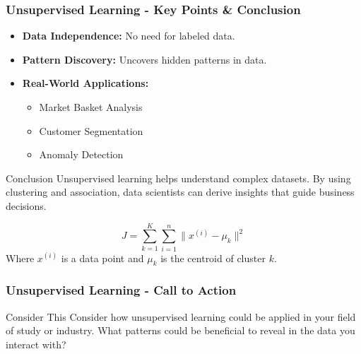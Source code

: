 \documentclass[aspectratio=169]{beamer}
\begin{document}
\begin{frame}[fragile]
    \frametitle{Unsupervised Learning - Key Points & Conclusion}
    \begin{itemize}
        \item \textbf{Data Independence:} No need for labeled data.
        \item \textbf{Pattern Discovery:} Uncovers hidden patterns in data.
        \item \textbf{Real-World Applications:}
        \begin{itemize}
            \item Market Basket Analysis
            \item Customer Segmentation
            \item Anomaly Detection
        \end{itemize}
    \end{itemize}

    \begin{block}{Conclusion}
        Unsupervised learning helps understand complex datasets. By using clustering and association, data scientists can derive insights that guide business decisions.
    \end{block}
  
    \begin{equation}
        J = \sum_{k=1}^{K} \sum_{i=1}^{n} \|x^{(i)} - \mu_k\|^2
    \end{equation}
    Where \(x^{(i)}\) is a data point and \(\mu_k\) is the centroid of cluster \(k\).
\end{frame}

\begin{frame}[fragile]
    \frametitle{Unsupervised Learning - Call to Action}
    \begin{block}{Consider This}
        Consider how unsupervised learning could be applied in your field of study or industry. 
        What patterns could be beneficial to reveal in the data you interact with?
    \end{block}
\end{frame}
\end{document}
